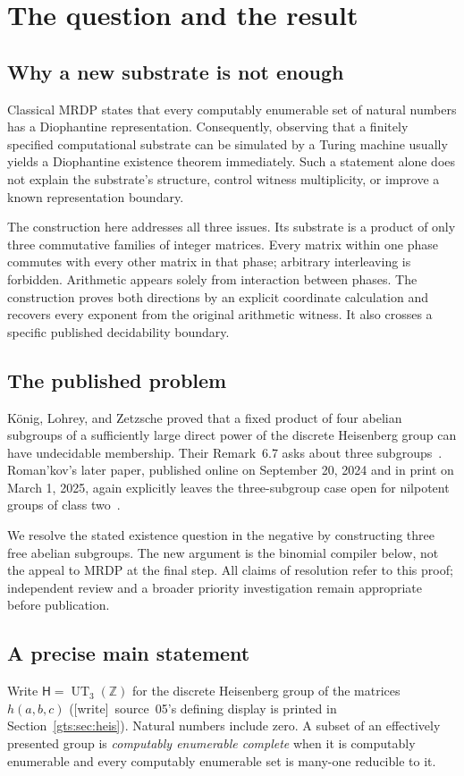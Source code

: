 \documentclass[11pt,letterpaper]{article}
\theoremstyle{definition}
\theoremstyle{remark}
\newcommand{\ZZ}{\mathbb Z}
\newcommand{\HH}{\mathsf H}
\newcommand{\wtag}{\textup{[write]}}
\begin{document}
\section{The question and the result}
\label{gts:tp:sec:intro}

\subsection{Why a new substrate is not enough}
Classical MRDP states that every computably enumerable set of natural numbers
has a Diophantine representation. Consequently, observing that a finitely
specified computational substrate can be simulated by a Turing machine
usually yields a Diophantine existence theorem immediately. Such a statement
alone does not explain the substrate's structure, control witness
multiplicity, or improve a known representation boundary.

The construction here addresses all three issues. Its substrate is a product
of only three commutative families of integer matrices. Every matrix within
one phase commutes with every other matrix in that phase; arbitrary
interleaving is forbidden. Arithmetic appears solely from interaction between
phases. The construction proves both directions by an explicit coordinate
calculation and recovers every exponent from the original arithmetic
witness. It also crosses a specific published decidability boundary.

\subsection{The published problem}
K\"onig, Lohrey, and Zetzsche proved that a fixed product of four abelian
subgroups of a sufficiently large direct power of the discrete Heisenberg
group can have undecidable membership. Their Remark~6.7 asks about three
subgroups~\cite{KLZ}. Roman'kov's later paper, published online on September
20, 2024 and in print on March 1, 2025, again explicitly leaves the
three-subgroup case open for nilpotent groups of class two~\cite{Romankov}.

We resolve the stated existence question in the negative by constructing
three free abelian subgroups. The new argument is the binomial compiler
below, not the appeal to MRDP at the final step. All claims of resolution
refer to this proof; independent review and a broader priority investigation
remain appropriate before publication.

\subsection{A precise main statement}
Write $\HH=\operatorname{UT}_3(\ZZ)$ for the discrete Heisenberg group of the matrices $h(a,b,c)$ (\wtag\ source~05's defining display is printed in Section~\ref{gts:sec:heis}).
Natural numbers include zero. A subset of an effectively presented group is
\emph{computably enumerable complete} when it is computably enumerable and
every computably enumerable set is many-one reducible to it.
\end{document}
